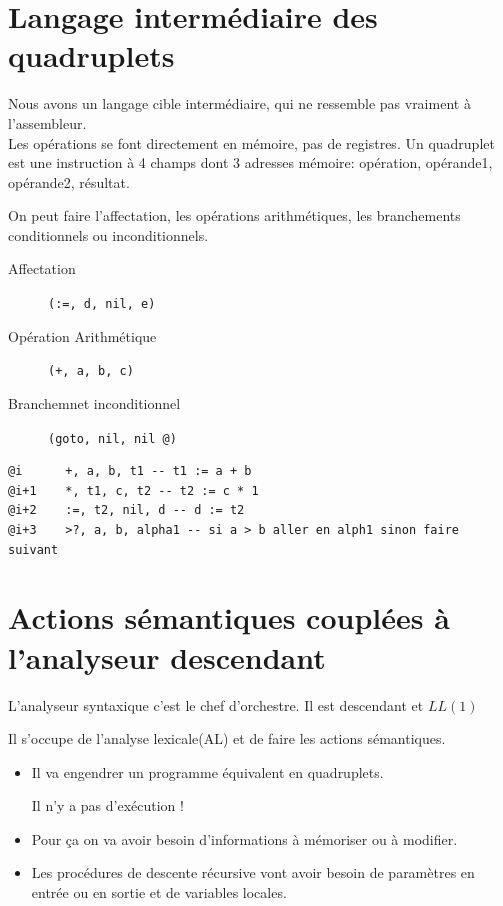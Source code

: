 \documentclass[12pt,a4paper,openany]{book}
\begin{document}
	\section{Langage intermédiaire des quadruplets}
	Nous avons un langage cible intermédiaire, qui ne ressemble pas vraiment à l'assembleur.\\
	Les opérations se font directement en mémoire, pas de registres. Un quadruplet est une instruction à 4 champs dont 3 adresses mémoire: 
	opération, opérande1, opérande2, résultat.

	On peut faire l'affectation, les opérations arithmétiques, les branchements conditionnels ou inconditionnels.
	\begin{description}
		\item[Affectation] \texttt{(:=, d, nil, e)}
		\item[Opération Arithmétique] \texttt{(+, a, b, c)}
		\item[Branchemnet inconditionnel] \texttt{(goto, nil, nil @)} 
	\end{description}

	\begin{lstlisting}[language=Algo, caption=Exemple de quadriplets]
@i		+, a, b, t1 -- t1 := a + b
@i+1	*, t1, c, t2 -- t2 := c * 1
@i+2	:=, t2, nil, d -- d := t2
@i+3	>?, a, b, alpha1 -- si a > b aller en alph1 sinon faire suivant
	\end{lstlisting}
	\section{Actions sémantiques couplées à l'analyseur descendant}
	L'analyseur syntaxique c’est le chef d’orchestre. Il est descendant et $LL(1)$

	Il s’occupe de l'analyse lexicale(AL) et de faire les actions sémantiques.
	\begin{itemize}
		\item Il va engendrer un programme équivalent en quadruplets.
			\begin{attention}
				Il n'y a pas d'exécution !
			\end{attention}
		\item Pour ça on va avoir besoin d’informations à mémoriser ou à modifier.
		\item Les procédures de descente récursive vont avoir besoin de paramètres en entrée ou en sortie et de variables locales.
	\end{itemize}
\end{document}
